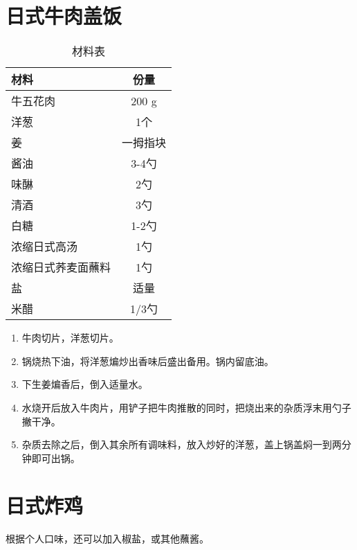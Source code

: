 \section{日式牛肉盖饭}

\begin{table}[h!]
    \centering
    \begin{tabular}{|l||c|}\hline
     \textbf{材料}    &  \textbf{份量}\\ \hline\hline
    牛五花肉    &  200 g  \\ \hline
    洋葱     &  1个\\ \hline
    姜     &  一拇指块 \\ \hline
    酱油     & 3-4勺  \\ \hline
    味醂     & 2勺  \\ \hline
    清酒     & 3勺  \\ \hline
    白糖     & 1-2勺  \\ \hline
    浓缩日式高汤     & 1勺  \\ \hline
    浓缩日式荞麦面蘸料     & 1勺  \\ \hline
    盐     &  适量 \\ \hline
    米醋     & 1/3勺 \\ \hline
    \end{tabular}
    \caption{材料表}
\end{table}


\begin{enumerate}
    \item 牛肉切片，洋葱切片。
 
    \item 锅烧热下油，将洋葱煸炒出香味后盛出备用。锅内留底油。
  
    \item 下生姜煸香后，倒入适量水。
    
    \item 水烧开后放入牛肉片，用铲子把牛肉推散的同时，把烧出来的杂质浮末用勺子撇干净。
    \item 杂质去除之后，倒入其余所有调味料，放入炒好的洋葱，盖上锅盖焖一到两分钟即可出锅。
\end{enumerate}


\section{日式炸鸡}

根据个人口味，还可以加入椒盐，或其他蘸酱。

